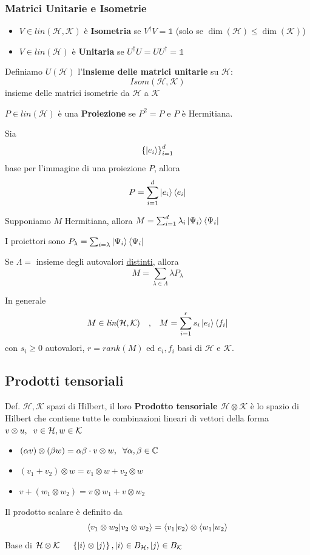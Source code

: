 \subsubsection{Matrici Unitarie e Isometrie}
\begin{itemize}
	\item $V \in \textit{lin}(\mathcal{H,K})$ è \textbf{Isometria} se $V^\dagger V = \mathbb{1}$ (solo se $\dim(\mathcal{H}) \le\dim(\mathcal{K})$)
	
	\item $V\in \textit{lin}(\mathcal{H})$ è \textbf{Unitaria} se $U^\dagger U = UU^\dagger = \mathbb{1}$
	
\end{itemize}

Definiamo $U(\mathcal{H})$ l'\textbf{insieme delle matrici unitarie} su $\mathcal{H}$:
$$\textit{Isom}(\mathcal{H,K})$$ 
insieme delle matrici isometrie da $\mathcal{H}$ a $\mathcal{K}$

$P \in \textit{lin}(\mathcal{H})$ è una \textbf{Proiezione} se $P^2 = P$ e $P$ è Hermitiana.

Sia $$\left\{\ket{e_i} \right\}^d_{i=1}$$ base per l'immagine di una proiezione $P$, allora 
$$P = \sum^d_{i=1}\ket{e_i}\bra{e_i}$$

Supponiamo $M$ Hermitiana, allora $M = \sum^d_{i=1} \lambda_i \ket{\Psi_i}\bra{\Psi_i}$

\medskip
I proiettori sono $P_\lambda = \sum_{i=\lambda} \ket{\Psi_i}\bra{\Psi_i}$

\medskip
Se $\Lambda =$ insieme degli autovalori \underline{distinti}, allora $$M = \sum_{\lambda\in \Lambda} \lambda P_\lambda$$

In generale $$M\in\textit{lin}(\mathcal{H,K}) \quad \text{,} \quad M = \sum^r_{i=1} s_i\ket{e_i}\bra{f_i}$$
con $s_i\ge0$ autovalori, $r = \textit{rank}(M)$ ed $e_i,f_i$ basi di $\mathcal{H}$ e $\mathcal{K}$.

\newpage
\subsection{Prodotti tensoriali}
Def. $\mathcal{H,K}$ spazi di Hilbert, il loro \textbf{Prodotto tensoriale $\mathcal{H} \otimes \mathcal{K}$} è lo spazio di Hilbert che contiene tutte le combinazioni lineari di vettori della forma $v \otimes u, \hspace{0.2cm} v\in\mathcal{H}, w \in \mathcal{K}$
\begin{itemize}
	\item $(\alpha v) \otimes (\beta w) = \alpha\beta \cdot v\otimes w, \hspace{0.2cm} \forall\alpha,\beta \in \mathbb{C}$
	\item $(v_1 + v_2) \otimes w = v_1 \otimes w + v_2 \otimes w$
	\item $v + (w_1 \otimes w_2) = v \otimes w_1 + v \otimes w_2$
\end{itemize}
Il prodotto scalare è definito da
$$\braket{v_1 \otimes w_2 |v_2 \otimes w_2} = \braket{v_1|v_2} \otimes\braket{w_1|w_2}$$
Base di $\mathcal{H} \otimes \mathcal{K} \hspace{0.5cm} \left\{ \ket{i} \otimes\ket{j} \right\}, \ket{i}\in B_\mathcal{H}, \ket{j} \in B_\mathcal{K}$

